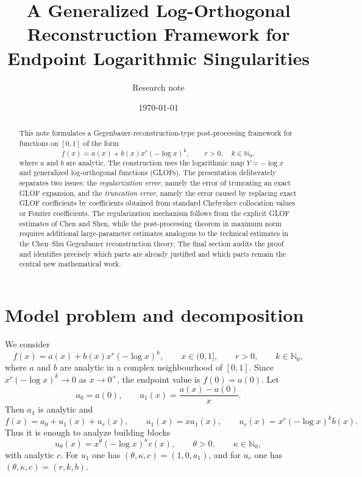 \documentclass[11pt]{article}
\title{A Generalized Log-Orthogonal Reconstruction Framework for Endpoint Logarithmic Singularities}
\author{Research note}
\date{\today}
\begin{document}
\maketitle

\begin{abstract}
This note formulates a Gegenbauer-reconstruction-type post-processing framework for functions on $[0,1]$ of the form
\[
        f(x)=a(x)+b(x)x^r(-\log x)^k,\qquad r>0,\quad k\in\mathbb{N}_0,
\]
where $a$ and $b$ are analytic.  The construction uses the logarithmic map $Y=-\log x$ and generalized log-orthogonal functions (GLOFs).  The presentation deliberately separates two issues: the \emph{regularization error}, namely the error of truncating an exact GLOF expansion, and the \emph{truncation error}, namely the error caused by replacing exact GLOF coefficients by coefficients obtained from standard Chebyshev collocation values or Fourier coefficients.  The regularization mechanism follows from the explicit GLOF estimates of Chen and Shen, while the post-processing theorem in maximum norm requires additional large-parameter estimates analogous to the technical estimates in the Chen--Shu Gegenbauer reconstruction theory.  The final section audits the proof and identifies precisely which parts are already justified and which parts remain the central new mathematical work.
\end{abstract}

\section{Model problem and decomposition}

We consider
\begin{equation}\label{eq:model}
    f(x)=a(x)+b(x)x^r(-\log x)^k,
    \qquad x\in(0,1],\qquad r>0,
    \qquad k\in\mathbb{N}_0,
\end{equation}
where $a$ and $b$ are analytic in a complex neighbourhood of $[0,1]$.  Since $x^r(-\log x)^k\to0$ as $x\to0^+$, the endpoint value is $f(0)=a(0)$.  Let
\[
    a_0=a(0),\qquad a_1(x)=\frac{a(x)-a(0)}{x}.
\]
Then $a_1$ is analytic and
\begin{equation}\label{eq:decomp}
    f(x)=a_0+u_1(x)+u_r(x),
    \qquad
    u_1(x)=x a_1(x),
    \qquad
    u_r(x)=x^r(-\log x)^k b(x).
\end{equation}
Thus it is enough to analyze building blocks
\begin{equation}\label{eq:block}
    u_\theta(x)=x^\theta(-\log x)^\kappa c(x),
    \qquad \theta>0,
    \qquad \kappa\in\mathbb{N}_0,
\end{equation}
with analytic $c$.  For $u_1$ one has $(\theta,\kappa,c)=(1,0,a_1)$, and for $u_r$ one has $(\theta,\kappa,c)=(r,k,b)$.
\end{document}
